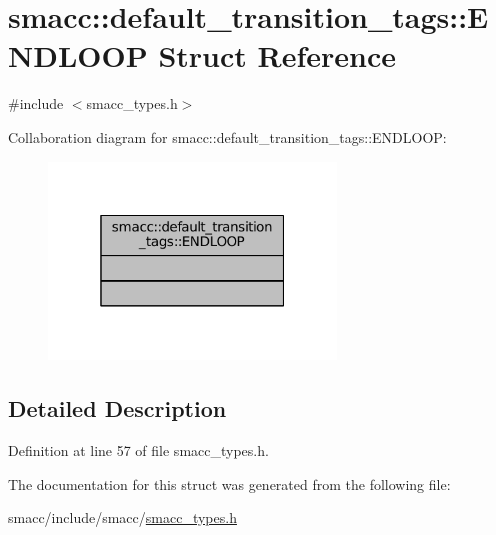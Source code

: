 \hypertarget{structsmacc_1_1default__transition__tags_1_1ENDLOOP}{}\section{smacc\+:\+:default\+\_\+transition\+\_\+tags\+:\+:E\+N\+D\+L\+O\+OP Struct Reference}
\label{structsmacc_1_1default__transition__tags_1_1ENDLOOP}


{\ttfamily \#include $<$smacc\+\_\+types.\+h$>$}



Collaboration diagram for smacc\+:\+:default\+\_\+transition\+\_\+tags\+:\+:E\+N\+D\+L\+O\+OP\+:
\nopagebreak
\begin{figure}[H]
\begin{center}
\leavevmode
\includegraphics[width=217pt]{structsmacc_1_1default__transition__tags_1_1ENDLOOP__coll__graph}
\end{center}
\end{figure}


\subsection{Detailed Description}


Definition at line 57 of file smacc\+\_\+types.\+h.



The documentation for this struct was generated from the following file\+:\begin{DoxyCompactItemize}
\item 
smacc/include/smacc/\hyperlink{smacc__types_8h}{smacc\+\_\+types.\+h}\end{DoxyCompactItemize}
